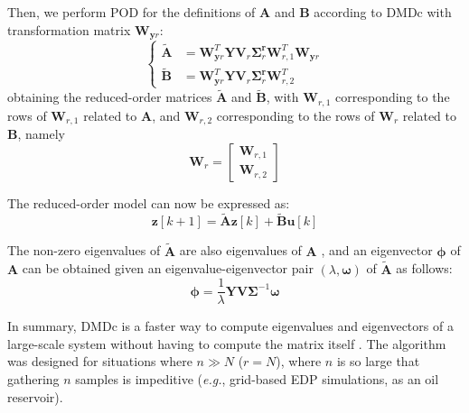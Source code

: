 Then, we perform POD for the definitions of $\mathbf{A}$ and $\mathbf{B}$ according to DMDc \cite{DMDc} with transformation matrix $\mathbf{W}_{\mathbf{y}r}$:
\begin{equation} \label{eqn:dmd2}
\left \{
\begin{aligned}
    \widetilde{\mathbf{A}} &= \mathbf{W}_{\mathbf{y}r}^T\mathbf{Y}\mathbf{V}_{r}\mathbf{\Sigma}_{r}^{\mathbf{r}}
                \mathbf{W}_{r,1}^T\mathbf{W}_{\mathbf{y}r}\\
    \widetilde{\mathbf{B}} &= \mathbf{W}_{\mathbf{y}r}^T\mathbf{Y}\mathbf{V}_{r}
         \mathbf{\Sigma}_r^\mathbf{r}\mathbf{W}_{r,2}^T
\end{aligned}
         \right .
\end{equation}
%
obtaining the reduced-order matrices $\widetilde{\mathbf{A}}$ and $\widetilde{\mathbf{B}}$, with $\mathbf{W}_{r,1}$ corresponding to the rows of $\mathbf{W}_{r,1}$ related to $\mathbf{A}$, and $\mathbf{W}_{r,2}$ corresponding to the rows of $\mathbf{W}_{r}$ related to $\mathbf{B}$, namely
\begin{equation*}
   \mathbf{W}_r = 
       \begin{bmatrix}
            \mathbf{W}_{r,1} \\
            \mathbf{W}_{r,2}
        \end{bmatrix}
\end{equation*}


The reduced-order model can now be expressed as:
\begin{equation}
\mathbf{z}[k+1] = \widetilde{\mathbf{A}}\mathbf{z}[k] 
         + \widetilde{\mathbf{B}}\mathbf{u}[k] 
\end{equation}


The non-zero eigenvalues of $\widetilde{\mathbf{A}}$ are also eigenvalues of $\mathbf{A}$ \cite{Htu2014}, and an eigenvector $\boldsymbol{\phi}$ of $\mathbf{A}$ can be obtained given an eigenvalue-eigenvector pair $(\lambda,\boldsymbol{\omega})$ of $\widetilde{\mathbf{A}}$ as follows:
\begin{equation}
    \boldsymbol{\phi} = \frac{1}{\lambda}\mathbf{Y}\mathbf{V}\mathbf{\Sigma}^{-1}\boldsymbol{\omega}
\end{equation}

In summary, DMDc is a faster way to compute eigenvalues and eigenvectors of a large-scale system without having to compute the matrix itself \cite{Htu2014}.
%
The algorithm was designed for situations where $n \gg N$ ($r = N$), where $n$ is so large that gathering $n$ samples is impeditive (\textit{e.g.}, grid-based EDP simulations, as an oil reservoir).
  
